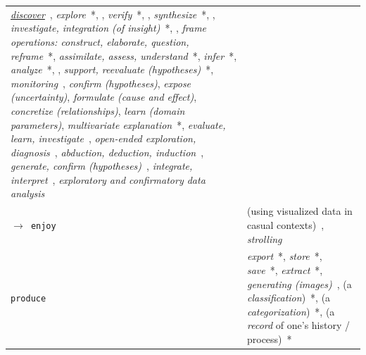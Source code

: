 \begin{table}
\begin{center}
\begin{tabular}{p{}>{\RaggedRight}p{}}
        	{\it \underline{discover}}~\cite{Marchionini2006}, %
        	{\it explore}~\cite{Zhou1998}*, \cite{vanWijk2006},
        	{\it verify}~\cite{Casner1991}*, \cite{Marchionini2006},
        	{\it synthesize}~\cite{Mullins1993}*, \cite{Marchionini2006}, %
        	{\it investigate, integration (of insight)}~\cite{Springmeyer1992}*, \cite{Marchionini2006},
        	{\it frame operations: construct, elaborate, question, reframe}~\cite{Klein2006}*,
        	{\it assimilate, assess, understand}~\cite{Pike2009}*,
        	{\it infer}~\cite{Valiati2006}*,
        	{\it analyze}~\cite{Mullins1993,Pike2009}*, \cite{Marchionini2006},
        	{\it support, reevaluate (hypotheses)}~\cite{Pirolli2005}*, %
        	{\it monitoring}~\cite{Ware2012},
        	{\it confirm (hypotheses)},
        	{\it expose (uncertainty)},
        	{\it formulate (cause and effect)},
        	{\it concretize (relationships)},
        	{\it learn (domain parameters)},
        	{\it multivariate explanation}~\cite{Amar2004}*,
        	{\it evaluate, learn, investigate}~\cite{Marchionini2006},
        	{\it open-ended exploration, diagnosis}~\cite{Plaisant1995},
        	{\it abduction, deduction, induction}~\cite{Pike2009},
        	{\it generate, confirm (hypotheses)}~\cite{Andre2009,Friel2001}, %
        	{\it integrate, interpret}~\cite{Friel2001},
        	{\it exploratory and confirmatory data analysis}~\cite{Tukey1977} %
    
    \\
    
        {\tt $\rightarrow$ enjoy}\index{{\tt enjoy}} &
    
    	    (using visualized data in casual contexts)~\cite{Pousman2007,Sprague2012},
    	    {\it strolling}~\cite{Dork2012}
    
    \\ \rowcolor{blue!10}
    
        {\tt produce}\index{{\tt produce}} &
    
        	{\it export}~\cite{Roth2012,Roth2013}*,
        	{\it store}~\cite{Mullins1993}*,
        	{\it save}~\cite{Liu2010,Roth2012,Roth2013}*,
        	{\it extract}~\cite{Card1999,Shneiderman1996}*,
        	{\it generating (images)}~\cite{Plaisant1995},
        	(a {\it classification})~\cite{Card1999,Springmeyer1992}*,
        	(a {\it categorization})~\cite{Mullins1993,Wehrend1990,Zhou1998}*,
        	(a {\it record} of one's history / process)~\cite{Heer2012,Shneiderman1996,Springmeyer1992}*
        	

\end{tabular}
\end{center}
\end{table}
